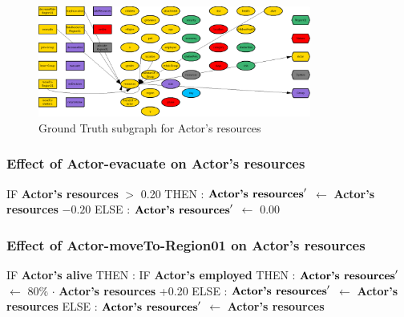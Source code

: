 \documentclass{article}%
\begin{document}
\begin{figure}[ht]%
\centering%
\includegraphics[width=0.8\textwidth]{images/resourcesOfActor.png}%
\caption{Ground Truth subgraph for Actor's resources}%
\end{figure}

%
\subsubsection{Effect of Actor{-}evacuate on Actor's resources}%
\label{ssubsec:Effect of Actor{-}evacuate on Actor's resources}%
\begin{flushleft}%
IF %
\textbf{Actor's resources}%
$>$%
0.20%
\linebreak%
\hspace*{2em}%
THEN %
: %
$\mbox{\textbf{Actor's resources}} '$%
$\leftarrow$%
\textbf{Actor's resources}%
${-}0.20$%
\linebreak%
\hspace*{2em}%
ELSE %
: %
$\mbox{\textbf{Actor's resources}} '$%
$\leftarrow$%
0.00%
\end{flushleft}

%
\subsubsection{Effect of Actor{-}moveTo{-}Region01 on Actor's resources}%
\label{ssubsec:Effect of Actor{-}moveTo{-}Region01 on Actor's resources}%
\begin{flushleft}%
IF %
\textbf{Actor's alive}%
\linebreak%
\hspace*{2em}%
THEN %
: %
IF %
\textbf{Actor's employed}%
\linebreak%
\hspace*{4em}%
THEN %
: %
$\mbox{\textbf{Actor's resources}} '$%
$\leftarrow$%
80\%%
$\cdot$%
\textbf{Actor's resources}%
+0.20%
\linebreak%
\hspace*{4em}%
ELSE %
: %
$\mbox{\textbf{Actor's resources}} '$%
$\leftarrow$%
\textbf{Actor's resources}%
\linebreak%
\hspace*{2em}%
ELSE %
: %
$\mbox{\textbf{Actor's resources}} '$%
$\leftarrow$%
\textbf{Actor's resources}%
\end{flushleft}
\end{document}
